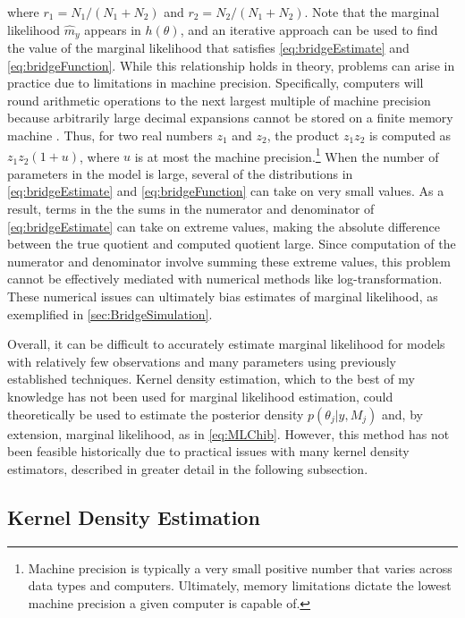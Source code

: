 \documentclass[twocolumn]{article}
\begin{document}
where $r_1 = N_1 / (N_1 + N_2)$ and $r_2 = N_2 / (N_1 + N_2)$. Note that the marginal likelihood $\hat{m}_y$ appears in $h(\theta)$, and an iterative approach can be used to find the value of the marginal likelihood that satisfies \cref{eq:bridgeEstimate} and \cref{eq:bridgeFunction}. While this relationship holds in theory, problems can arise in practice due to limitations in machine precision. Specifically, computers will round arithmetic operations to the next largest multiple of machine precision because arbitrarily large decimal expansions cannot be stored on a finite memory machine \citep{MachinePrecision}. Thus, for two real numbers $z_1$ and $z_2$, the product $z_1 z_2$ is computed as $z_1 z_2 (1 + u)$, where $u$ is at most the machine precision.\footnote{Machine precision is typically a very small positive number that varies across data types and computers. Ultimately, memory limitations dictate the lowest machine precision a given computer is capable of.} When the number of parameters in the model is large, several of the distributions in \cref{eq:bridgeEstimate} and \cref{eq:bridgeFunction} can take on very small values. As a result, terms in the the sums in the numerator and denominator of \cref{eq:bridgeEstimate} can take on extreme values, making the absolute difference between the true quotient and computed quotient large.  Since computation of the numerator and denominator involve summing these extreme values, this problem cannot be effectively mediated with numerical methods like log-transformation. These numerical issues can ultimately bias estimates of marginal likelihood, as exemplified in \cref{sec:BridgeSimulation}.

Overall, it can be difficult to accurately estimate marginal likelihood for models with relatively few observations and many parameters using previously established techniques. Kernel density estimation, which to the best of my knowledge has not been used for marginal likelihood estimation, could theoretically be used to estimate the posterior density $p(\theta_j|y, M_j)$ and, by extension, marginal likelihood, as in \cref{eq:MLChib}. However, this method has not been feasible historically due to practical issues with many kernel density estimators, described in greater detail in the following subsection.

\subsection{Kernel Density Estimation}
\label{sec:KDE}
\end{document}
